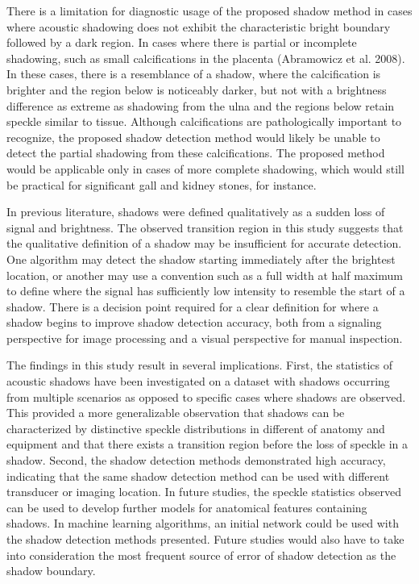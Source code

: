 \documentclass[authoryear,preprint,review,12pt]{elsarticle}
\begin{document}
There is a limitation for diagnostic usage of the proposed shadow method in cases where acoustic shadowing does not exhibit the characteristic bright boundary followed by a dark region. In cases where there is partial or incomplete shadowing, such as small calcifications in the placenta (Abramowicz et al. 2008). In these cases, there is a resemblance of a shadow, where the calcification is brighter and the region below is noticeably darker, but not with a brightness difference as extreme as shadowing from the ulna and the regions below retain speckle similar to tissue. Although calcifications are pathologically important to recognize, the proposed shadow detection method would likely be unable to detect the partial shadowing from these calcifications. The proposed method would be applicable only in cases of more complete shadowing, which would still be practical for significant gall and kidney stones, for instance.

In previous literature, shadows were defined qualitatively \citep{Kremkau1986} as a sudden loss of signal and brightness. The observed transition region in this study suggests that the qualitative definition of a shadow may be insufficient for accurate detection. One algorithm may detect the shadow starting immediately after the brightest location, or another may use a convention such as a full width at half maximum to define where the signal has sufficiently low intensity to resemble the start of a shadow. There is a decision point required for a clear definition for where a shadow begins to improve shadow detection accuracy, both from a signaling perspective for image processing and a visual perspective for manual inspection. 


The findings in this study result in several implications. First, the statistics of acoustic shadows have been investigated on a dataset with shadows occurring from multiple scenarios as opposed to specific cases where shadows are observed. This provided a more generalizable observation that shadows can be characterized by distinctive speckle distributions in different of anatomy and equipment and that there exists a transition region before the loss of speckle in a shadow. Second, the shadow detection methods demonstrated high accuracy, indicating that the same shadow detection method can be used with different transducer or imaging location. In future studies, the speckle statistics observed can be used to develop further models for anatomical features containing shadows. In machine learning algorithms, an initial network could be used with the shadow detection methods presented. Future studies would also have to take into consideration the most frequent source of error of shadow detection as the shadow boundary.
\end{document}

